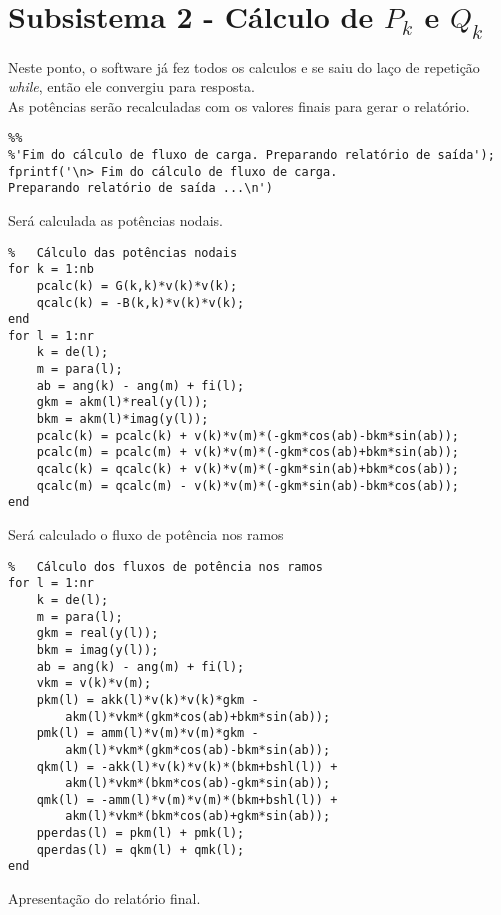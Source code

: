 \section{Subsistema 2 - Cálculo de $P_k$ e $Q_k$}
Neste ponto, o software já fez todos os calculos e se saiu do laço de repetição \textit{while}, então ele convergiu para resposta.\\
As potências serão recalculadas com os valores finais para gerar o relatório.
\begin{verbatim}
%%
%'Fim do cálculo de fluxo de carga. Preparando relatório de saída');
fprintf('\n> Fim do cálculo de fluxo de carga. 
Preparando relatório de saída ...\n')
\end{verbatim}
Será calculada as potências nodais.
\begin{verbatim}
%	Cálculo das potências nodais
for k = 1:nb
	pcalc(k) = G(k,k)*v(k)*v(k);
    qcalc(k) = -B(k,k)*v(k)*v(k);
end
for l = 1:nr
	k = de(l);
    m = para(l);
    ab = ang(k) - ang(m) + fi(l);
    gkm = akm(l)*real(y(l));
    bkm = akm(l)*imag(y(l));
    pcalc(k) = pcalc(k) + v(k)*v(m)*(-gkm*cos(ab)-bkm*sin(ab));
    pcalc(m) = pcalc(m) + v(k)*v(m)*(-gkm*cos(ab)+bkm*sin(ab));
    qcalc(k) = qcalc(k) + v(k)*v(m)*(-gkm*sin(ab)+bkm*cos(ab));
    qcalc(m) = qcalc(m) - v(k)*v(m)*(-gkm*sin(ab)-bkm*cos(ab));
end
\end{verbatim}
Será calculado o fluxo de potência nos ramos
\begin{verbatim}
%	Cálculo dos fluxos de potência nos ramos
for l = 1:nr
    k = de(l);
    m = para(l);
    gkm = real(y(l));
    bkm = imag(y(l));
    ab = ang(k) - ang(m) + fi(l);
    vkm = v(k)*v(m);
    pkm(l) = akk(l)*v(k)*v(k)*gkm -
        akm(l)*vkm*(gkm*cos(ab)+bkm*sin(ab));
    pmk(l) = amm(l)*v(m)*v(m)*gkm -
        akm(l)*vkm*(gkm*cos(ab)-bkm*sin(ab));
    qkm(l) = -akk(l)*v(k)*v(k)*(bkm+bshl(l)) +
        akm(l)*vkm*(bkm*cos(ab)-gkm*sin(ab));
    qmk(l) = -amm(l)*v(m)*v(m)*(bkm+bshl(l)) +
        akm(l)*vkm*(bkm*cos(ab)+gkm*sin(ab));
    pperdas(l) = pkm(l) + pmk(l);
    qperdas(l) = qkm(l) + qmk(l);
end
\end{verbatim}
Apresentação do relatório final. 
